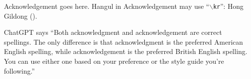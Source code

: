 Acknowledgement goes here. Hangul in Acknowledgement may use ``\texttt{$\backslash$kr}'': Hong Gildong ().

ChatGPT says ``Both acknowledgment and acknowledgement are correct spellings. The only difference is that acknowledgment is the preferred American English spelling, while acknowledgement is the preferred British English spelling. You can use either one based on your preference or the style guide you're following.''